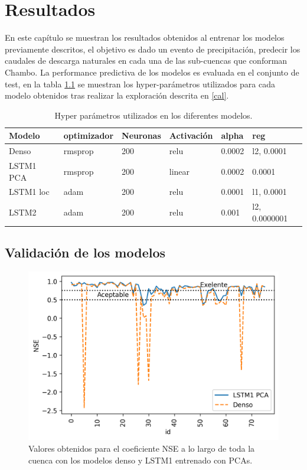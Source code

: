 \chapter{Resultados}
\label{capitulo 3}

En este capítulo se muestran los resultados obtenidos al entrenar los modelos previamente descritos, 
el objetivo es dado un evento de precipitación,  predecir los caudales de descarga naturales en cada una de las sub-cuencas que conforman Chambo. 
La performance predictiva de los modelos es evaluada en el conjunto de test, 
en la tabla \ref{hyperres} se muestran los hyper-parámetros utilizados para cada modelo obtenidos
tras realizar la exploración descrita en \ref{cal}.


\begin{table}[]
  \begin{center} 
  \begin{tabular}{|l|l|l|l|l|l|}
    \hline
   Modelo&optimizador &Neuronas & Activación & alpha & reg \\
   \hline
   Denso & rmsprop& 200& relu & 0.0002 &l2, 0.0001  \\
   LSTM1 PCA & rmsprop  &200 & linear & 0.0002  &  0.0001 \\
   LSTM1 loc & adam & 200 & relu & 0.0001 &  l1, 0.0001  \\
   LSTM2 & adam & 200 & relu &  0.001 & l2, 0.0000001 \\
  
   \hline

  \end{tabular}
  \caption{ Hyper parámetros utilizados en los diferentes modelos.}
  \label{hyperres}
\end{center}
  \end{table}

\section{Validación de los modelos}


 \begin{figure}[h!]
   \begin{center}
     \includegraphics[height=3.in]{Figures/NSE/NSEs_LSTM1s_PCA.png}
     \caption{ Valores obtenidos para el coeficiente NSE a lo largo de toda la cuenca con los modelos denso
     y LSTM1 entrenado con PCAs.}
     \label{NSE1}
   \end{center}
 \end{figure}


